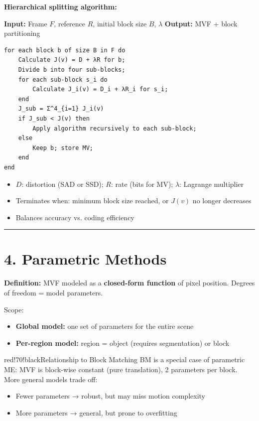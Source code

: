 \textbf{Hierarchical splitting algorithm:}

\textbf{Input:} Frame $F$, reference $R$, initial block size $B$, $\lambda$ \textbf{Output:} MVF + block partitioning

\begin{verbatim}
for each block b of size B in F do
    Calculate J(v) = D + λR for b;
    Divide b into four sub-blocks;
    for each sub-block s_i do
        Calculate J_i(v) = D_i + λR_i for s_i;
    end
    J_sub = Σ^4_{i=1} J_i(v)
    if J_sub < J(v) then
        Apply algorithm recursively to each sub-block;
    else
        Keep b; store MV;
    end
end

\end{verbatim}

\begin{itemize}
\item $D$: distortion (SAD or SSD); $R$: rate (bits for MV); $\lambda$: Lagrange multiplier
\item Terminates when: minimum block size reached, or $J(v)$ no longer decreases
\item Balances accuracy vs. coding efficiency
\end{itemize}

\bigskip\hrule\bigskip

\section{4. Parametric Methods}

\textbf{Definition:} MVF modeled as a \textbf{closed-form function} of pixel position. Degrees of freedom = model parameters.

Scope:
\begin{itemize}
\item \textbf{Global model:} one set of parameters for the entire scene
\item \textbf{Per-region model:} region = object (requires segmentation) or block
\end{itemize}

\begin{calloutbox}{red!70!black}{Relationship to Block Matching}
BM is a special case of parametric ME: MVF is block-wise constant (pure translation), 2 parameters per block. More general models trade off:
\begin{itemize}
\item Fewer parameters → robust, but may miss motion complexity
\item More parameters → general, but prone to overfitting
\end{itemize}
\end{calloutbox}

